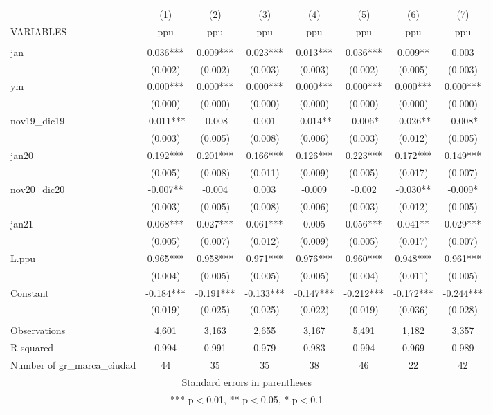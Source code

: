 \begin{tabular}{lccccccc} \hline
 & (1) & (2) & (3) & (4) & (5) & (6) & (7) \\
VARIABLES & ppu & ppu & ppu & ppu & ppu & ppu & ppu \\ \hline
 &  &  &  &  &  &  &  \\
jan & 0.036*** & 0.009*** & 0.023*** & 0.013*** & 0.036*** & 0.009** & 0.003 \\
 & (0.002) & (0.002) & (0.003) & (0.003) & (0.002) & (0.005) & (0.003) \\
ym & 0.000*** & 0.000*** & 0.000*** & 0.000*** & 0.000*** & 0.000*** & 0.000*** \\
 & (0.000) & (0.000) & (0.000) & (0.000) & (0.000) & (0.000) & (0.000) \\
nov19\_dic19 & -0.011*** & -0.008 & 0.001 & -0.014** & -0.006* & -0.026** & -0.008* \\
 & (0.003) & (0.005) & (0.008) & (0.006) & (0.003) & (0.012) & (0.005) \\
jan20 & 0.192*** & 0.201*** & 0.166*** & 0.126*** & 0.223*** & 0.172*** & 0.149*** \\
 & (0.005) & (0.008) & (0.011) & (0.009) & (0.005) & (0.017) & (0.007) \\
nov20\_dic20 & -0.007** & -0.004 & 0.003 & -0.009 & -0.002 & -0.030** & -0.009* \\
 & (0.003) & (0.005) & (0.008) & (0.006) & (0.003) & (0.012) & (0.005) \\
jan21 & 0.068*** & 0.027*** & 0.061*** & 0.005 & 0.056*** & 0.041** & 0.029*** \\
 & (0.005) & (0.007) & (0.012) & (0.009) & (0.005) & (0.017) & (0.007) \\
L.ppu & 0.965*** & 0.958*** & 0.971*** & 0.976*** & 0.960*** & 0.948*** & 0.961*** \\
 & (0.004) & (0.005) & (0.005) & (0.005) & (0.004) & (0.011) & (0.005) \\
Constant & -0.184*** & -0.191*** & -0.133*** & -0.147*** & -0.212*** & -0.172*** & -0.244*** \\
 & (0.019) & (0.025) & (0.025) & (0.022) & (0.019) & (0.036) & (0.028) \\
 &  &  &  &  &  &  &  \\
Observations & 4,601 & 3,163 & 2,655 & 3,167 & 5,491 & 1,182 & 3,357 \\
R-squared & 0.994 & 0.991 & 0.979 & 0.983 & 0.994 & 0.969 & 0.989 \\
 Number of gr\_marca\_ciudad & 44 & 35 & 35 & 38 & 46 & 22 & 42 \\ \hline
\multicolumn{8}{c}{ Standard errors in parentheses} \\
\multicolumn{8}{c}{ *** p$<$0.01, ** p$<$0.05, * p$<$0.1} \\
\end{tabular}
